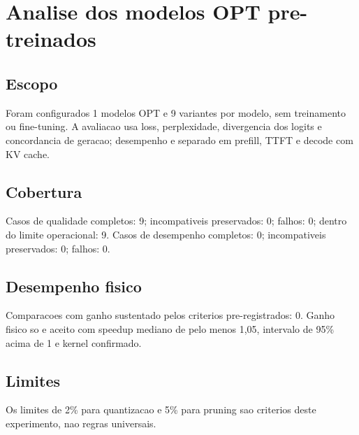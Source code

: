 \chapter{Analise dos modelos OPT pre-treinados}
\section{Escopo}
Foram configurados 1 modelos OPT e 9 variantes por modelo, sem treinamento ou fine-tuning.
A avaliacao usa loss, perplexidade, divergencia dos logits e concordancia de geracao; desempenho e separado em prefill, TTFT e decode com KV cache.
\section{Cobertura}
Casos de qualidade completos: 9; incompativeis preservados: 0; falhos: 0; dentro do limite operacional: 9.
Casos de desempenho completos: 0; incompativeis preservados: 0; falhos: 0.
\section{Desempenho fisico}
Comparacoes com ganho sustentado pelos criterios pre-registrados: 0.
Ganho fisico so e aceito com speedup mediano de pelo menos 1,05, intervalo de 95\% acima de 1 e kernel confirmado.
\section{Limites}
Os limites de 2\% para quantizacao e 5\% para pruning sao criterios deste experimento, nao regras universais.
